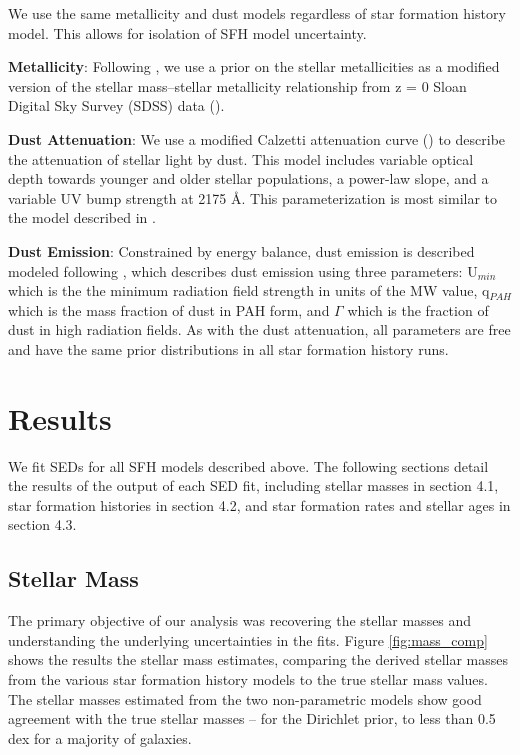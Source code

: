 \documentclass[twocolumn]{aastex62}
\begin{document}
We use the same metallicity and dust models regardless of star formation history model. This allows for isolation of SFH model uncertainty. 

\textbf{Metallicity}: Following \cite{leja_older_2019}, we use a prior on the stellar metallicities as a modified version of the stellar mass–stellar metallicity relationship from z = 0 Sloan Digital Sky Survey (SDSS) data (\cite{gallazzi_ages_2005}). 

\textbf{Dust Attenuation}: We use a modified Calzetti attenuation curve (\cite{calzetti_dust_2001}) to describe the attenuation of stellar light by dust. This model includes variable optical depth towards younger and older stellar populations, a power-law slope, and a variable UV bump strength at 2175 {\AA}. This parameterization is most similar to the model described in \cite{noll_analysis_2009}.   

\textbf{Dust Emission}: Constrained by energy balance, dust emission is described modeled following \cite{draine_infrared_2007}, which describes dust emission using three parameters: U$_{min}$ which is the the minimum radiation field strength in units of the MW value, q$_{PAH}$ which is the mass fraction of dust in PAH form, and $\Gamma$ which is the fraction of dust in high radiation fields. As with the dust attenuation, all parameters are free and have the same prior distributions in all star formation history runs. 



\section{Results} 

We fit SEDs for all SFH models described above. The following sections detail the results of the output of each SED fit, including stellar masses in section 4.1, star formation histories in section 4.2, and star formation rates and stellar ages in section 4.3. 

\subsection{Stellar Mass}

The primary objective of our analysis was recovering the stellar masses and understanding the underlying uncertainties in the fits. Figure \ref{fig:mass_comp} shows the results the stellar mass estimates, comparing the derived stellar masses from the various star formation history models to the true stellar mass values. The stellar masses estimated from the two non-parametric models show good agreement with the true stellar masses -- for the Dirichlet prior, to less than 0.5 dex for a majority of galaxies. 
\end{document}
